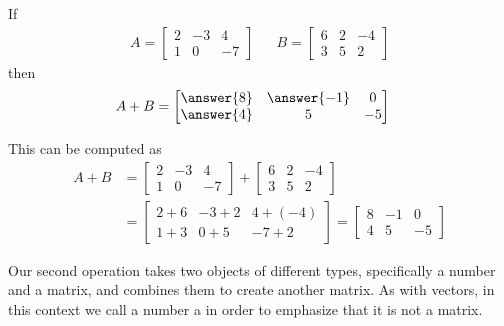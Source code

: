 \documentclass{ximera}
\begin{document}
\begin{example}
  If
  \begin{align*}
    A=
    \begin{bmatrix}
      2&-3&4\\
      1&0&-7
    \end{bmatrix}
       &&
          B=
          \begin{bmatrix}
            6&2&-4\\
            3&5&2
          \end{bmatrix}
  \end{align*}
  then
  \begin{align*}
    A+B&=\begin{bmatrix}
      \answer{8}&\answer{-1}&0\\
      \answer{4}&5&-5
    \end{bmatrix}
  \end{align*}

     \begin{hint}
     This can be computed as
     \begin{align*}
       A+B&=
            \begin{bmatrix}
              2&-3&4\\
              1&0&-7
            \end{bmatrix}
                   +
                   \begin{bmatrix}
                     6&2&-4\\
                     3&5&2
                   \end{bmatrix}\\
          &=
            \begin{bmatrix}
              2+6&-3+2&4+(-4)\\
              1+3&0+5&-7+2
            \end{bmatrix}
                       =\begin{bmatrix}
                         8&-1&0\\
                         4&5&-5
                       \end{bmatrix}
     \end{align*}
   \end{hint}
\end{example}

Our second operation takes two objects of different types,
specifically a number and a matrix, and combines them to create
another matrix.  As with vectors, in this context we call a number a
 in order to emphasize that it is not a matrix.
\end{document}
